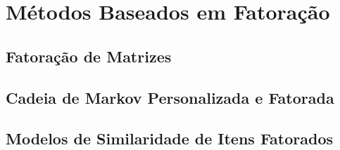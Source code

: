 \section{Métodos Baseados em Fatoração}
\subsection{Fatoração de Matrizes}
\subsection{Cadeia de Markov Personalizada e Fatorada}
\subsection{Modelos de Similaridade de Itens Fatorados}